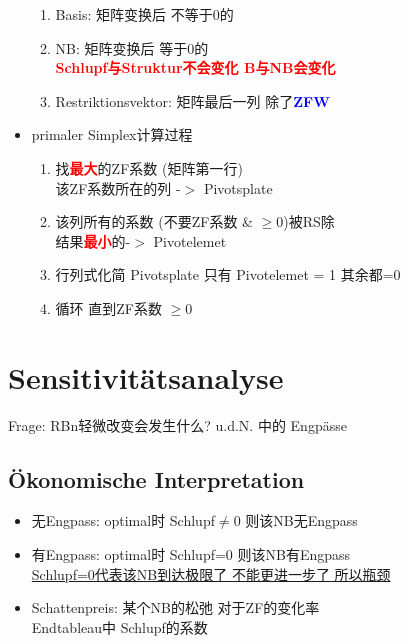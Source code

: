 \documentclass[12pt, letterpaper]{article}
\begin{document}
\begin{CJK*}{UTF8}{gbsn}
\begin{itemize}
\begin{enumerate}
\item Basis: 矩阵变换后 不等于0的
\item NB: 矩阵变换后 等于0的\\
\textbf{\textcolor{red}{Schlupf与Struktur不会变化 B与NB会变化}}

\item Restriktionsvektor: 矩阵最后一列 除了\textbf{\textcolor{blue}{ZFW}}

\end{enumerate}


\item primaler Simplex计算过程
\begin{enumerate}
\item 找\textbf{\textcolor{red}{最大}}的ZF系数 (矩阵第一行) \\
该ZF系数所在的列 -$>$ Pivotsplate

\item 该列所有的系数 (不要ZF系数 \& $\geq0$)被RS除\\
结果\textbf{\textcolor{red}{最小}}的-$>$ Pivotelemet

\item 行列式化简 Pivotsplate 只有 Pivotelemet = 1 其余都=0

\item 循环 直到ZF系数 $\geq0$


\end{enumerate}

\end{itemize}



\newpage
\section{Sensitivitätsanalyse}
Frage: RBn轻微改变会发生什么? u.d.N. 中的 Engpässe

\subsection{Ökonomische Interpretation}
\begin{itemize}
\item 无Engpass: optimal时 Schlupf$\neq$0 则该NB无Engpass
\item 有Engpass: optimal时 Schlupf=0 则该NB有Engpass\\
\underline{Schlupf=0代表该NB到达极限了 不能更进一步了 所以瓶颈}

\item Schattenpreis: 某个NB的松弛 对于ZF的变化率\\
Endtableau中 Schlupf的系数


\end{itemize}
\end{CJK*}
\end{document}
